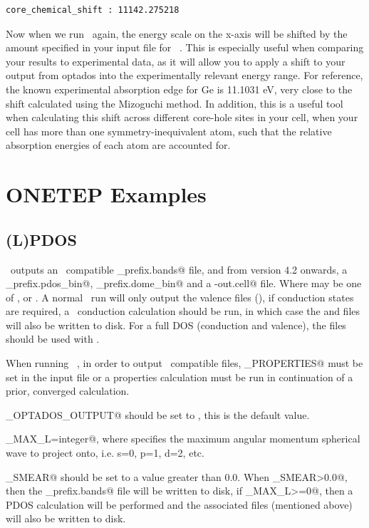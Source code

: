 \documentclass[a4paper,11pt,twoside]{book}
\begin{document}
{\begin{enumerate}
\begin{verbatim}
core_chemical_shift : 11142.275218
\end{verbatim}
Now when we run \optados\ again, the energy scale on the x-axis will be shifted by the amount specified in your input file for \optados\ . This is especially useful when comparing your results to experimental data, as it will allow you to apply a shift to your output from optados into the experimentally relevant energy range. For reference, the known experimental absorption edge for Ge is 11.1031 eV, very close to the shift calculated using the Mizoguchi method. In addition, this is a useful tool when calculating this shift across different core-hole sites in your cell, when your cell has more than one symmetry-inequivalent atom, such that the relative absorption energies of each atom are accounted for.
\end{enumerate}

\chapter{ONETEP Examples}
\section{(L)PDOS}
\onetep\ outputs an \optados\ compatible \verb@seedname_prefix.bands@ file, and from version 4.2 onwards, a \verb@seedname_prefix.pdos_bin@, \verb@seedname_prefix.dome_bin@ and a \verb@seedname-out.cell@ file. Where \verb@prefix@ may be one of \verb@val@, \verb@cond@ or \verb@joint@.
%
A normal \onetep\  run will only output the valence files (\verb@val@), if conduction states are required, a \onetep\  conduction calculation should be run, in which case the \verb@cond@ and \verb@joint@ files will also be written to disk.
%
For a full DOS (conduction and valence), the \verb@joint@ files should be used with \optados.

When running \onetep\ , in order to output \optados\ compatible files, \verb@DO_PROPERTIES@ must be set in the input file or a properties calculation must be run in continuation of a prior, converged calculation.

\verb@PDOS_OPTADOS_OUTPUT@ should be set to \verb@TRUE@,  this is the default value.

\verb@PDOS_MAX_L=integer@, where \verb@integer@ specifies the maximum angular momentum spherical wave to project onto, i.e. s=0, p=1, d=2, etc.

\verb@DOS_SMEAR@ should be set to a value greater than 0.0.
%
When \verb@DOS_SMEAR>0.0@, then the \verb@seedname_prefix.bands@ file will be written to disk, if \verb@PDOS_MAX_L>=0@, then a PDOS calculation will be performed and the associated files (mentioned above) will also be written to disk.

}
\end{document}
